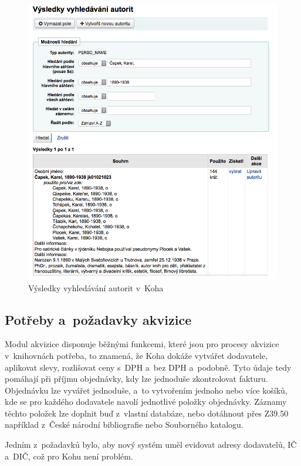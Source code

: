 \documentclass[
	11pt, oneside, printed, final, palatino, monochrome
	microtype,
	table,   %
	lof,     %
	lot     %
]{fithesis3}
\begin{document}
{\begin{figure}
    \centering
    \includegraphics[width=1.0\textwidth]{resources/vysledky_vyhledavani_autorit}
    \caption{Výsledky vyhledávání autorit v~Koha}
    \label{fig:vysledky_vyhledavani_autorit}
\end{figure}

\subsection{Potřeby a~požadavky akvizice}
Modul akvizice disponuje běžnými funkcemi, které jsou pro procesy akvizice v~knihovnách potřeba, to znamená, že Koha dokáže vytvářet dodavatele, aplikovat slevy, rozlišovat ceny s~DPH a~bez DPH a~podobně. Tyto údaje tedy pomáhají při příjmu objednávky, kdy lze jednoduše zkontrolovat fakturu. Objednávku lze vyvářet jednoduše, a~to vytvořením jednoho nebo více košíků, kde se pro každého dodavatele navolí jednotlivé položky objednávky. Záznamy těchto položek lze doplnit buď z~vlastní databáze, nebo dotáhnout přes Z39.50 například z~České národní bibliografie nebo Souborného katalogu.

Jedním z~požadavků bylo, aby nový systém uměl evidovat adresy dodavatelů, IČ a~DIČ, což pro Kohu není problém.

}
\end{document}
